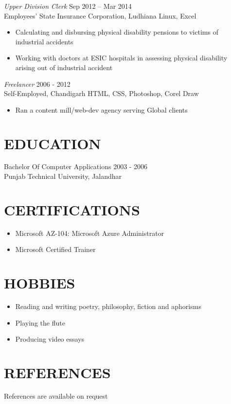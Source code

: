 \documentclass[margin, 10pt]{res} %
\begin{document}
\begin{resume}
{\sl Upper Division Clerk} \hfill Sep 2012 – Mar 2014 \\
Employees' State Insurance Corporation, Ludhiana \hfill Linux, Excel 
\begin{itemize}
\item Calculating and disbursing physical disability pensions to victims of industrial accidents
\item Working with doctors at ESIC hospitals in assessing physical disability arising out of industrial accident 
\end{itemize} 

{\sl Freelancer} \hfill 2006 - 2012 \\
Self-Employed, Chandigarh \hfill HTML, CSS, Photoshop, Corel Draw 
\begin{itemize}
\item Ran a content mill/web-dev agency serving Global clients
\end{itemize}


\section{EDUCATION}
Bachelor Of Computer Applications \hfill 2003 - 2006 \\
Punjab Technical University, Jalandhar 

\section{CERTIFICATIONS}
\begin{itemize}
\item Microsoft AZ-104: Microsoft Azure Administrator 
\item Microsoft Certified Trainer
\end{itemize}

\section{HOBBIES}
\begin{itemize}
\item Reading and writing poetry, philosophy, fiction and aphorisms
\item Playing the flute
\item Producing video essays
\end{itemize}

\section{REFERENCES}
References are available on request


\end{resume}
\end{document}
